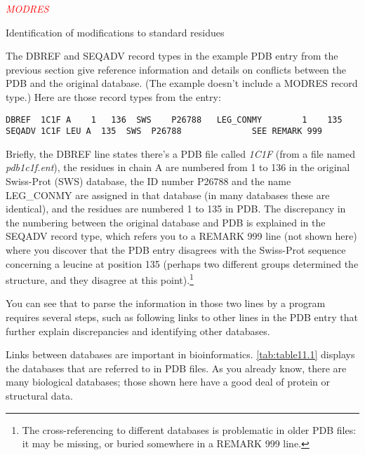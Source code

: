 \textcolor{red}{\textit{MODRES}}
\begin{adjustwidth}{2em}{}
Identification of modifications to standard residues 
\end{adjustwidth}

The DBREF and SEQADV record types in the example PDB entry from the previous section give reference information and details on conflicts between the PDB and the original database. (The example doesn't include a MODRES record type.) Here are those record types from the entry: 

\begin{lstlisting}
DBREF  1C1F A    1   136  SWS    P26788   LEG_CONMY        1    135             
SEQADV 1C1F LEU A  135  SWS  P26788              SEE REMARK 999 
\end{lstlisting}

Briefly, the DBREF line states there's a PDB file called \textit{1C1F} (from a file named \textit{pdb1c1f.ent}), the residues in chain A are numbered from 1 to 136 in the original Swiss-Prot (SWS) database, the ID number P26788 and the name LEG\_CONMY are assigned in that database (in many databases these are identical), and the residues are numbered 1 to 135 in PDB. The discrepancy in the numbering between the original database and PDB is explained in the SEQADV record type, which refers you to a REMARK 999 line (not shown here) where you discover that the PDB entry disagrees with the Swiss-Prot sequence concerning a leucine at position 135 (perhaps two different groups determined the structure, and they disagree at this point).\footnote{The cross-referencing to different databases is problematic in older PDB files: it may be missing, or buried somewhere in a REMARK 999 line.} 

You can see that to parse the information in those two lines by a program requires several steps, such as following links to other lines in the PDB entry that further explain discrepancies and identifying other databases.

Links between databases are important in bioinformatics. \autoref{tab:table11.1} displays the databases that are referred to in PDB files. As you already know, there are many biological databases; those shown here have a good deal of protein or structural data. 

